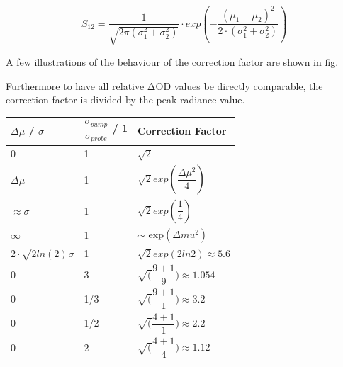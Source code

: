 \documentclass[twoside,openright]{scrreprt}
\begin{document}
\begin{equation}\label{eq:S12CorrectionFactor}
S_{12} = \dfrac{1}{\sqrt{2\pi\left(\sigma_1^2+\sigma_2^2\right)}}\cdot exp\left(-\dfrac{\left(\mu_1 - \mu_2\right)^2}{2\cdot \left(\sigma_1^2+\sigma_2^2\right)}\right)
\end{equation}


A few illustrations of the behaviour of the correction factor are shown in fig.

Furthermore to have all relative $\mathrm{\Delta OD}$ values be directly comparable, the correction factor is divided by the peak radiance value.

\begin{table}[h]
\begin{tabular}{lll}
$\Delta \mu$ / $\sigma$               & $\dfrac{\sigma_{pump}}{\sigma_{probe}}$ / 1 & Correction Factor                                                                                                \\ \hline
0                                     & 1                                           & $\sqrt{2}$                                                                                                        \\
$\Delta\mu$                           & 1                                           & $\sqrt{2} exp \left( \dfrac{\Delta \mu ^2}{4}\right)$                                                             \\
$\approx \sigma$                      & 1                                           & $\sqrt{2}exp\left(\dfrac{1}{4}\right)$                                                                            \\
$\infty$ & 1                                           & $\sim$ exp$\left(\Delta mu ^2 \right)$ \\
$2\cdot\sqrt{2 ln(2)}\sigma$       & 1                                           & $\sqrt{2}exp(2ln2)\approx 5.6$                                                                                    \\
0                                     & 3                                           & $\sqrt(\dfrac{9+1}{9}) \approx 1.054$                                                                             \\
0                                     & 1/3                                         & $\sqrt(\dfrac{9+1}{1}) \approx 3.2$                                                                               \\
0                                     & 1/2                                         & $\sqrt(\dfrac{4+1}{1}) \approx 2.2$                                                                               \\
0                                     & 2                                           & $\sqrt(\dfrac{4+1}{4}) \approx 1.12$                                                                             
\end{tabular}
\end{table}
\end{document}

